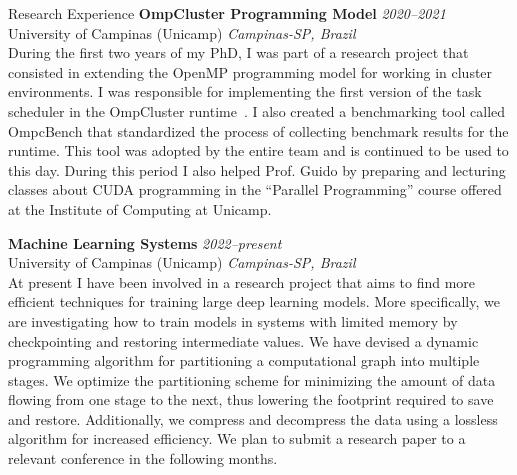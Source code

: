 \documentclass{resume}
\begin{document}
\begin{rSection}{Research Experience}
{\bf OmpCluster Programming Model} \hfill {\em 2020--2021} \\
{\sc University of Campinas (Unicamp)} \hfill {\em Campinas-SP, Brazil} \\
During the first two years of my PhD, I was part of a research project that
consisted in extending the OpenMP programming model for working in cluster
environments. I was responsible for implementing the first version of the task
scheduler in the OmpCluster runtime~\cite{ICPP23, SBAC22}. I also created a
benchmarking tool called OmpcBench that standardized the process of collecting
benchmark results for the runtime. This tool was adopted by the entire team and
is continued to be used to this day. During this period I also helped Prof.
Guido by preparing and lecturing classes about CUDA programming in the
``Parallel Programming'' course offered at the Institute of Computing at
Unicamp.

{\bf Machine Learning Systems} \hfill {\em 2022--present} \\
{\sc University of Campinas (Unicamp)} \hfill {\em Campinas-SP, Brazil} \\
At present I have been involved in a research project that aims to find more
efficient techniques for training large deep learning models. More specifically,
we are investigating how to train models in systems with limited memory by
checkpointing and restoring intermediate values. We have devised a dynamic
programming algorithm for partitioning a computational graph into multiple
stages. We optimize the partitioning scheme for minimizing the amount of data
flowing from one stage to the next, thus lowering the footprint required to save
and restore. Additionally, we compress and decompress the data using a lossless
algorithm for increased efficiency. We plan to submit a research paper to a
relevant conference in the following months.

\end{rSection}

\end{document}
